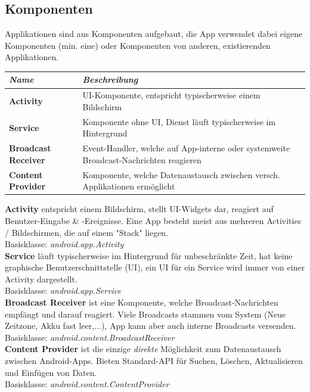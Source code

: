 \documentclass[a4paper]{article}
\begin{document}
	\subsection{Komponenten}
		Applikationen sind aus Komponenten aufgebaut, die App verwendet dabei eigene Komponenten (min. eine) oder Komponenten von anderen, existierenden Applikationen.
	\begin{table}[h!]
		\begin{tabular}{ l | p{11cm} }
			\textbf{\textit{Name}}               & \textbf{\textit{Beschreibung}} \\
			\hline
			\textbf{Activity}           & UI-Komponente, entspricht typischerweise einem Bildschirm \\
			\textbf{Service}            & Komponente ohne UI, Dienst läuft typischerweise im Hintergrund \\
			\textbf{Broadcast Receiver} & Event-Handler, welche auf App-interne oder systemweite Broadcast-Nachrichten reagieren \\
			\textbf{Content Provider}   & Komponente, welche Datenaustausch zwischen versch. Applikationen ermöglicht
		\end{tabular}
	\end{table}
	
	\noindent
	\textbf{Activity} entspricht einem Bildschirm, stellt UI-Widgets dar, reagiert auf Benutzer-Eingabe \& -Ereignisse. Eine App besteht meist aus mehreren Activities / Bildschirmen, die auf einem "Stack" liegen. \\
	Basisklasse: \textit{android.app.Activity} \\
	\textbf{Service} läuft typischerweise im Hintergrund für unbeschränkte Zeit, hat keine graphische Benutzer\-schnittstelle (UI), ein UI für ein Service wird immer von einer Activity dargestellt. \\
	Basisklasse: \textit{android.app.Service} \\
	\textbf{Broadcast Receiver} ist eine Komponente, welche Broadcast-Nachrichten empfängt und darauf reagiert. Viele Broadcasts stammen vom System (Neue Zeitzone, Akku fast leer,...), App kann aber auch interne Broadcasts versenden. \\
	Basisklasse: \textit{android.content.BroadcastReceiver}\\
	\textbf{Content Provider} ist die einzige \textit{direkte} Möglichkeit zum Datenaustausch zwischen Android-Apps. Bieten Standard-API für Suchen, Löschen, Aktualisieren und Einfügen von Daten. \\
	Basisklasse: \textit{android.content.ContentProvider}
	
\end{document}
